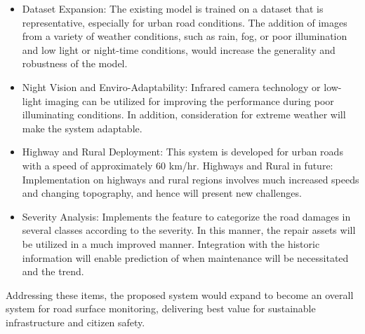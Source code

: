 \begin{itemize}

\item Dataset Expansion: The existing model is trained on a dataset that is representative, especially for urban road conditions. The addition of images from a variety of weather conditions, such as rain, fog, or poor illumination and low light or night-time conditions, would increase the generality and robustness of the model.

\item Night Vision and Enviro-Adaptability: Infrared camera technology or low-light imaging can be utilized for improving the performance during poor illuminating conditions. In addition, consideration for extreme weather will make the system adaptable.

\item Highway and Rural Deployment: This system is developed for urban roads with a speed of approximately 60 km/hr. Highways and Rural in future: Implementation on highways and rural regions involves much increased speeds and changing topography, and hence will present new challenges.

\item Severity Analysis: Implements the feature to categorize the road damages in several classes according to the severity. In this manner, the repair assets will be utilized in a much improved manner. Integration with the historic information will enable prediction of when maintenance will be necessitated and the trend.
     
\end{itemize}

Addressing these items, the proposed system would expand to become an overall system for road surface monitoring, delivering best value for sustainable infrastructure and citizen safety.